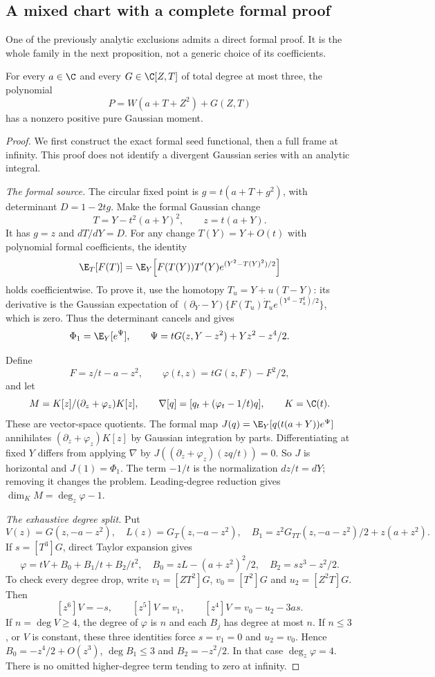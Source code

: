 \subsection{A mixed chart with a complete formal proof}\label{sec:mixedformal}

One of the previously analytic exclusions admits a direct formal proof.
It is the whole family in the next proposition, not a generic choice
of its coefficients.

\begin{proposition}\label{prop:mixedformal}
For every $a\in\C$ and every $G\in\C[Z,T]$ of total degree at most
three, the polynomial
\[
 P=W(a+T+Z^2)+G(Z,T)
\]
has a nonzero positive pure Gaussian moment.
\end{proposition}
\begin{proof}
We first construct the exact formal seed functional, then a full frame
at infinity. This proof does not identify a divergent Gaussian series
with an analytic integral.

\emph{The formal source.}
The circular fixed point is $g=t(a+T+g^2)$, with determinant
$D=1-2tg$. Make the formal Gaussian change
\[
 T=Y-t^2(a+Y)^2,\qquad z=t(a+Y).
\]
It has $g=z$ and $dT/dY=D$. For any change $T(Y)=Y+O(t)$ with
polynomial formal coefficients, the identity
\[
 \E_T[F(T)]=\E_Y\!\left[F(T(Y))T'(Y)
             e^{(Y^2-T(Y)^2)/2}\right]
\]
holds coefficientwise. To prove it, use the homotopy
$T_u=Y+u(T-Y)$: its derivative is the Gaussian expectation of
$(\partial_Y-Y)\{F(T_u)\dot T_u e^{(Y^2-T_u^2)/2}\}$, which is zero.
Thus the determinant cancels and gives
\[
 \Phi_1=\E_Y[e^\Psi],\qquad
 \Psi=tG(z,Y-z^2)+Yz^2-z^4/2.
\]

Define
\[
 F=z/t-a-z^2,\qquad \varphi(t,z)=tG(z,F)-F^2/2,
\]
and let
\[
 M=K[z]/(\partial_z+\varphi_z)K[z],\qquad
 \nabla[q]=[q_t+(\varphi_t-1/t)q],\qquad K=\C(t).
\]
These are vector-space quotients. The formal map
$J(q)=\E_Y[q(t(a+Y))e^\Psi]$ annihilates
$(\partial_z+\varphi_z)K[z]$ by Gaussian integration by parts.
Differentiating at fixed $Y$ differs from applying $\nabla$ by
$J((\partial_z+\varphi_z)(zq/t))=0$.
So $J$ is horizontal and $J(1)=\Phi_1$. The term $-1/t$ is the
normalization $dz/t=dY$; removing it changes the problem.
Leading-degree reduction gives $\dim_K M=\deg_z\varphi-1$.

\emph{The exhaustive degree split.}
Put
\[
 V(z)=G(z,-a-z^2),\quad L(z)=G_T(z,-a-z^2),\quad
 B_1=z^2G_{TT}(z,-a-z^2)/2+z(a+z^2).
\]
If $s=[T^3]G$, direct Taylor expansion gives
\begin{equation}\label{eq:mixedphi}
 \varphi=tV+B_0+B_1/t+B_2/t^2,
 \quad B_0=zL-(a+z^2)^2/2,\quad B_2=sz^3-z^2/2.
\end{equation}
To check every degree drop, write $v_1=[ZT^2]G$,
$v_0=[T^2]G$ and $u_2=[Z^2T]G$. Then
\[
 [z^6]V=-s,\qquad [z^5]V=v_1,\qquad
 [z^4]V=v_0-u_2-3as.
\]
If $n=\deg V\geq4$, the degree of $\varphi$ is $n$ and each $B_j$
has degree at most $n$. If $n\leq3$, or $V$ is constant, these three
identities force $s=v_1=0$ and $u_2=v_0$. Hence
$B_0=-z^4/2+O(z^3)$, $\deg B_1\leq3$ and $B_2=-z^2/2$.
In that case $\deg_z\varphi=4$. There is no omitted higher-degree
term tending to zero at infinity.


\end{proof}
